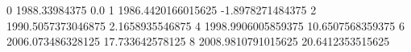 0 1988.33984375 0.0
1 1986.4420166015625 -1.8978271484375
2 1990.5057373046875 2.1658935546875
4 1998.9906005859375 10.6507568359375
6 2006.073486328125 17.733642578125
8 2008.9810791015625 20.6412353515625
